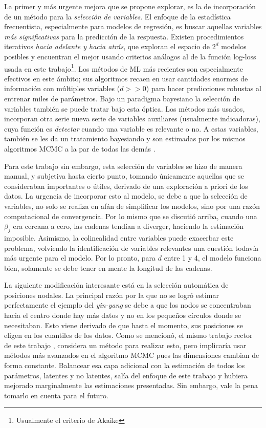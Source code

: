 \documentclass[../Main/Main.tex]{subfiles}
\begin{document}
La primer y más urgente mejora que se propone explorar, es la de incorporación de un método para la \textit{selección de variables}. El enfoque de la estadística frecuentista, especialmente para modelos de regresión, es buscar aquellas variables \textit{más significativas} para la predicción de la respuesta. Existen procedimientos iterativos \textit{hacia adelante y hacia atrás}, que exploran el espacio de $2^d$ modelos posibles y encuentran el mejor usando criterios análogos al de la función log-loss usada en este trabajo\footnote{Usualmente el criterio de Akaike}. Los métodos de ML más recientes son especialmente efectivos en este ámbito; sus algoritmos recaen en usar cantidades enormes de información con múltiples variables ($d>>0$) para hacer predicciones robustas al entrenar miles de parámetros. Bajo un paradigma bayesiano la selección de variables también se puede tratar bajo esta óptica. Los métodos más usados, incorporan otra serie nueva serie de variables auxiliares (usualmente indicadoras), cuya función es \textit{detectar} cuando una variable es relevante o no. A estas variables, también se les da un tratamiento bayesiando y son estimadas por los mismos algoritmos MCMC a la par de todas las demás \autocite{o2009review}.

Para este trabajo sin embargo, esta selección de variables se hizo de manera manual, y subjetiva hasta cierto punto, tomando únicamente aquellas que se consideraban importantes o útiles, derivado de una exploración a priori de los datos. La urgencia de incorporar esto al modelo, se debe a que la selección de variables, no solo se realiza en afán de simplificar los modelos, sino por una razón computacional de convergencia. Por lo mismo que se discutió arriba, cuando una $\beta_j$ era cercana a cero, las cadenas tendían a diverger, haciendo la estimación imposible. Asimismo, la colinealidad entre variables puede exacerbar este problema, volviendo la identificación de variables relevantes una cuestión todavía más urgente para el modelo. Por lo pronto, para $d$ entre 1 y 4, el modelo funciona bien, solamente se debe tener en mente la longitud de las cadenas.

La siguiente modificación interesante está en la selección automática de posiciones nodales. La principal razón por la que no se logró estimar perfectamente el ejemplo del \textit{yin-yang} se debe a que los nodos se concentraban hacia el centro donde hay más datos y no en los pequeños círculos donde se necesitaban. Esto viene derivado de que hasta el momento, sus posiciones se eligen en los cuantiles de los datos. Como se mencionó, el mismo trabajo rector de este trabajo \autocite{mallik1998automatic}, considera un método para realizar esto, pero implicaría usar métodos más avanzados en el algoritmo MCMC pues las dimensiones cambian de forma constante. Balancear esa capa adicional con la estimación de todos los parámetros, latentes y no latentes, salía del enfoque de este trabajo y hubiera mejorado marginalmente las estimaciones presentadas. Sin embargo, vale la pena tomarlo en cuenta para el futuro.
\end{document}

